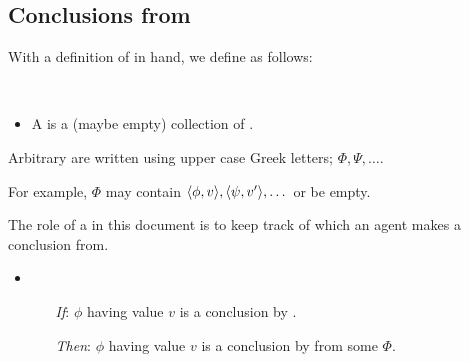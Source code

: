\subsection{Conclusions from }
\label{sec:pools-premises}

\begin{note}
  With a definition of  in hand, we define  as follows:

  \begin{definition}[\pool{3}]
    \label{def:pools}
    \mbox{ }
    \vspace{-\baselineskip}
    \begin{itemize}
    \item
      A \emph{\pool{}} is a (maybe empty) collection of .
    \end{itemize}
    \vspace{-\baselineskip}
  \end{definition}

  \begin{notation}
  \item
    Arbitrary  are written using upper case Greek letters; \(\Phi, \Psi, \dots\).

    For example, \(\Phi\) may contain \(\langle \phi, v \rangle, \langle \psi, v' \rangle, \dots\) or be empty.
  \end{notation}

  The role of a \pool{} in this document is to keep track of which  an agent makes a conclusion from.

  \begin{assumption}
    \label{assu:concluding:pools}
    \begin{itemize}[noitemsep]
    \item
      \begin{enumerate}
      \item[\emph{If}:]
        \(\phi\) having value \(v\) is a conclusion by \vAgent{}.
      \item[\emph{Then}:]
        \(\phi\) having value \(v\) is a conclusion by \vAgent{} from some \pool{} \(\Phi\).
      \end{enumerate}
    \end{itemize}
    \vspace{-\baselineskip}
  \end{assumption}


\end{note}
